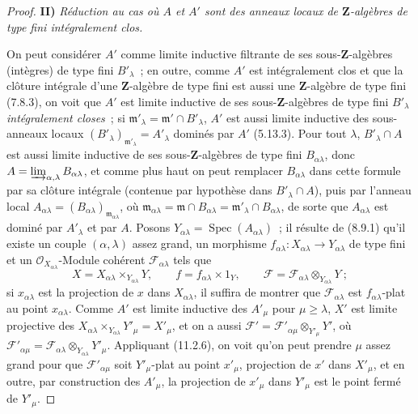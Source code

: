 \begin{proof}
\medskip
\noindent\textbf{II)} \emph{Réduction au cas où $A$ et $A'$ sont des anneaux
locaux de $\mathbf Z$-algèbres de type fini intégralement clos.}

On peut considérer $A'$ comme limite inductive filtrante de ses
sous-$\mathbf Z$-algèbres (intègres) de type fini $B'_{\lambda}$~; en outre,
comme $A'$ est intégralement clos et que la clôture intégrale d'une
$\mathbf Z$-algèbre de type fini est aussi une $\mathbf Z$-algèbre de type fini
(7.8.3), on voit que $A'$ est limite inductive de ses sous-$\mathbf Z$-algèbres
de type fini $B'_{\lambda}$ \emph{intégralement closes}~; si
$\mathfrak m'_{\lambda}=\mathfrak m'\cap B'_{\lambda}$, $A'$ est aussi limite
inductive des sous-anneaux locaux
$(B'_{\lambda})_{\mathfrak m'_{\lambda}}=A'_{\lambda}$ dominés par $A'$
(5.13.3). Pour tout $\lambda$, $B'_{\lambda}\cap A$ est aussi limite inductive
de ses sous-$\mathbf Z$-algèbres de type fini $B_{\alpha\lambda}$, donc
$A=\varinjlim_{\alpha,\lambda}B_{\alpha\lambda}$, et comme plus haut on peut
remplacer $B_{\alpha\lambda}$ dans cette formule par sa clôture intégrale
(contenue par hypothèse dans $B'_{\lambda}\cap A$), puis par l'anneau local
$A_{\alpha\lambda}=(B_{\alpha\lambda})_{\mathfrak m_{\alpha\lambda}}$, où
$\mathfrak m_{\alpha\lambda}=\mathfrak m\cap B_{\alpha\lambda}
=\mathfrak m'_{\lambda}\cap B_{\alpha\lambda}$, de sorte que
$A_{\alpha\lambda}$ est dominé par $A'_{\lambda}$ et par $A$. Posons
$Y_{\alpha\lambda}=\operatorname{Spec}(A_{\alpha\lambda})$~; il résulte de
(8.9.1) qu'il existe un couple $(\alpha,\lambda)$ assez grand, un morphisme
$f_{\alpha\lambda}:X_{\alpha\lambda}\to Y_{\alpha\lambda}$ de type fini et un
$\mathcal O_{X_{\alpha\lambda}}$-Module cohérent $\mathcal F_{\alpha\lambda}$
tels que
\[
X=X_{\alpha\lambda}\times_{Y_{\alpha\lambda}}Y,
\qquad f=f_{\alpha\lambda}\times1_Y,
\qquad \mathcal F=\mathcal F_{\alpha\lambda}\otimes_{Y_{\alpha\lambda}}Y~;
\]
si $x_{\alpha\lambda}$ est la projection de $x$ dans $X_{\alpha\lambda}$, il
suffira de montrer que $\mathcal F_{\alpha\lambda}$ est
$f_{\alpha\lambda}$-plat au point $x_{\alpha\lambda}$. Comme $A'$ est limite
inductive des $A'_{\mu}$ pour $\mu\geq\lambda$, $X'$ est limite projective des
$X_{\alpha\lambda}\times_{Y_{\alpha\lambda}}Y'_{\mu}=X'_{\mu}$, et on a aussi
$\mathcal F'=\mathcal F'_{\alpha\mu}\otimes_{Y'_{\mu}}Y'$, où
$\mathcal F'_{\alpha\mu}
=\mathcal F_{\alpha\lambda}\otimes_{Y_{\alpha\lambda}}Y'_{\mu}$.
Appliquant (11.2.6), on voit qu'on peut prendre $\mu$ assez grand pour que
$\mathcal F'_{\alpha\mu}$ soit $Y'_{\mu}$-plat au point $x'_{\mu}$, projection
de $x'$ dans $X'_{\mu}$, et en outre, par construction des $A'_{\mu}$, la
projection de $x'_{\mu}$ dans $Y'_{\mu}$ est le point fermé de $Y'_{\mu}$.


\end{proof}
